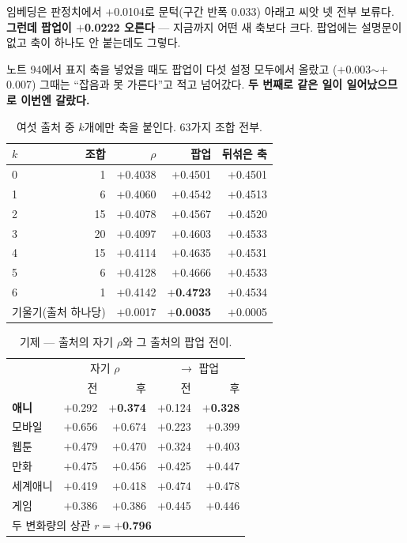 \documentclass[10pt]{article}
\begin{document}
임베딩은 판정치에서 $+$0.0104로 문턱(구간 반폭 0.033) 아래고 씨앗 넷 전부
보류다. \textbf{그런데 팝업이 $+$0.0222 오른다} --- 지금까지 어떤 새 축보다
크다. 팝업에는 설명문이 없고 축이 하나도 안 붙는데도 그렇다.

노트 94에서 표지 축을 넣었을 때도 팝업이 다섯 설정 모두에서 올랐고
($+$0.003$\sim+$0.007) 그때는 ``잡음과 못 가른다''고 적고 넘어갔다.
\textbf{두 번째로 같은 일이 일어났으므로 이번엔 갈랐다.}

\begin{table}[t]
\centering\tsize
\caption{여섯 출처 중 $k$개에만 축을 붙인다. 63가지 조합 전부.}
\begin{tabular}{lrrrr}
\toprule
$k$ & 조합 & $\rho$ & 팝업 & 뒤섞은 축 \\
\midrule
0 & 1 & $+$0.4038 & $+$0.4501 & $+$0.4501 \\
1 & 6 & $+$0.4060 & $+$0.4542 & $+$0.4513 \\
2 & 15 & $+$0.4078 & $+$0.4567 & $+$0.4520 \\
3 & 20 & $+$0.4097 & $+$0.4603 & $+$0.4533 \\
4 & 15 & $+$0.4114 & $+$0.4635 & $+$0.4531 \\
5 & 6 & $+$0.4128 & $+$0.4666 & $+$0.4533 \\
6 & 1 & $+$0.4142 & \textbf{$+$0.4723} & $+$0.4534 \\
\midrule
\multicolumn{2}{l}{기울기(출처 하나당)} & $+$0.0017 &
\textbf{$+$0.0035} & $+$0.0005 \\
\bottomrule
\end{tabular}
\end{table}


\begin{table}[t]
\centering\tsize
\caption{기제 --- 출처의 자기 $\rho$와 그 출처의 팝업 전이.}
\begin{tabular}{lrrrr}
\toprule
& \multicolumn{2}{c}{자기 $\rho$} & \multicolumn{2}{c}{$\to$ 팝업} \\
& 전 & 후 & 전 & 후 \\
\midrule
\textbf{애니} & $+$0.292 & \textbf{$+$0.374} & $+$0.124 & \textbf{$+$0.328} \\
모바일 & $+$0.656 & $+$0.674 & $+$0.223 & $+$0.399 \\
웹툰 & $+$0.479 & $+$0.470 & $+$0.324 & $+$0.403 \\
만화 & $+$0.475 & $+$0.456 & $+$0.425 & $+$0.447 \\
세계애니 & $+$0.419 & $+$0.418 & $+$0.474 & $+$0.478 \\
게임 & $+$0.386 & $+$0.386 & $+$0.445 & $+$0.446 \\
\midrule
\multicolumn{5}{l}{두 변화량의 상관 \quad $r=+$\textbf{0.796}} \\
\bottomrule
\end{tabular}
\end{table}
\end{document}

